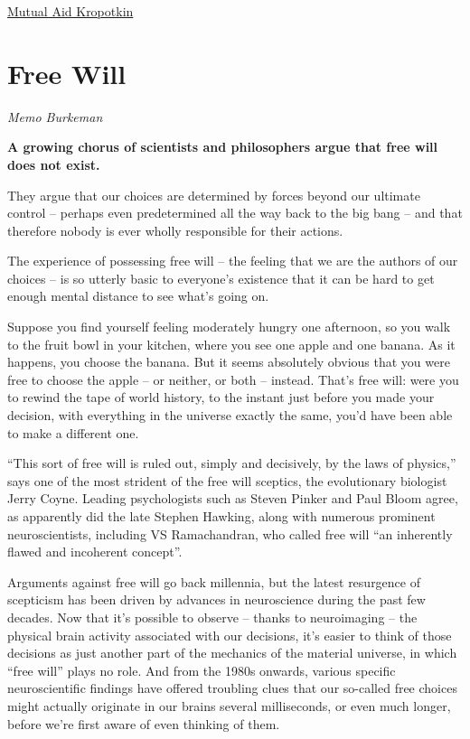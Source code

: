 \documentclass[
]{book}
\begin{document}
\href{https://theanarchistlibrary.org/library/andrej-grubacic-david-graeber-introduction-to-mutual-aid}{Mutual Aid Kropotkin}

\hypertarget{free-will}{%
\section{Free Will}\label{free-will}}

\emph{Memo Burkeman}

\textbf{A growing chorus of scientists and philosophers argue that free will does not exist.}

They argue that our choices are determined by forces beyond our ultimate control -- perhaps even predetermined all the way back to the big bang -- and that therefore nobody is ever wholly responsible for their actions.

The experience of possessing free will -- the feeling that we are the authors of our choices -- is so utterly basic to everyone's existence that it can be hard to get enough mental distance to see what's going on.

Suppose you find yourself feeling moderately hungry one afternoon, so you walk to the fruit bowl in your kitchen, where you see one apple and one banana. As it happens, you choose the banana. But it seems absolutely obvious that you were free to choose the apple -- or neither, or both -- instead. That's free will: were you to rewind the tape of world history, to the instant just before you made your decision, with everything in the universe exactly the same, you'd have been able to make a different one.

``This sort of free will is ruled out, simply and decisively, by the laws of physics,'' says one of the most strident of the free will sceptics, the evolutionary biologist Jerry Coyne.
Leading psychologists such as Steven Pinker and Paul Bloom agree, as apparently did the late Stephen Hawking, along with numerous prominent neuroscientists, including VS Ramachandran, who called free will ``an inherently flawed and incoherent concept''.

Arguments against free will go back millennia, but the latest resurgence of scepticism has been driven by advances in neuroscience during the past few decades. Now that it's possible to observe -- thanks to neuroimaging -- the physical brain activity associated with our decisions, it's easier to think of those decisions as just another part of the mechanics of the material universe, in which ``free will'' plays no role. And from the 1980s onwards, various specific neuroscientific findings have offered troubling clues that our so-called free choices might actually originate in our brains several milliseconds, or even much longer, before we're first aware of even thinking of them.
\end{document}
